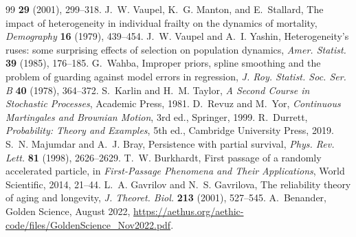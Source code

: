 \documentclass[11pt]{article}
\theoremstyle{definition}
\theoremstyle{remark}
\begin{document}
\begin{thebibliography}{99}
\textbf{29} (2001), 299--318.
 J.~W. Vaupel, K.~G. Manton, and E.~Stallard, The
impact of heterogeneity in individual frailty on the dynamics of
mortality, \emph{Demography} \textbf{16} (1979), 439--454.
 J.~W. Vaupel and A.~I. Yashin, Heterogeneity's ruses:
some surprising effects of selection on population dynamics,
\emph{Amer. Statist.} \textbf{39} (1985), 176--185.
 G.~Wahba, Improper priors, spline smoothing and the
problem of guarding against model errors in regression, \emph{J. Roy.
Statist. Soc. Ser. B} \textbf{40} (1978), 364--372.
 S.~Karlin and H.~M. Taylor, \emph{A Second Course in
Stochastic Processes}, Academic Press, 1981.
 D.~Revuz and M.~Yor, \emph{Continuous Martingales and
Brownian Motion}, 3rd ed., Springer, 1999.
 R.~Durrett, \emph{Probability: Theory and
Examples}, 5th ed., Cambridge University Press, 2019.
 S.~N. Majumdar and A.~J. Bray, Persistence with partial
survival, \emph{Phys. Rev. Lett.} \textbf{81} (1998), 2626--2629.
 T.~W. Burkhardt, First passage of a randomly
accelerated particle, in \emph{First-Passage Phenomena and Their
Applications}, World Scientific, 2014, 21--44.
 L.~A. Gavrilov and N.~S. Gavrilova, The reliability
theory of aging and longevity, \emph{J. Theoret. Biol.} \textbf{213}
(2001), 527--545.
 A.~Benander, Golden Science, August 2022,
\url{https://aethus.org/aethic-code/files/GoldenScience_Nov2022.pdf}.
\end{thebibliography}
\end{document}
